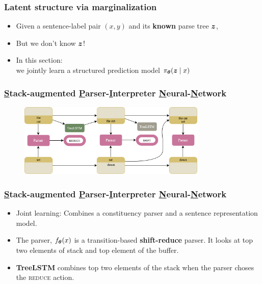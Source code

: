 
\begin{frame}
\frametitle{Latent structure via marginalization}
\begin{itemize}
    \item Given a sentence-label pair $(x, y)$ and its \textbf{known} parse
        tree $\boldsymbol{z}$,\\
    \item<5-> But we don't know $\boldsymbol{z}$!
    \item<6-> In this section: \\
        \quad we jointly learn a structured prediction model $\pi_{\boldsymbol{\theta}}(\boldsymbol{z} \mid x)$\\

\end{itemize}


\end{frame}



\begin{frame}
\frametitle{\underline{S}tack-augmented \underline{P}arser-\underline{I}nterpreter \underline{N}eural-\underline{N}etwork}%
{}
\begin{figure}
\includegraphics[width=0.8\textwidth]{img/spinnLatentTutorial.png}
\end{figure}
\end{frame}%


\begin{frame}%
\frametitle{\underline{S}tack-augmented \underline{P}arser-\underline{I}nterpreter \underline{N}eural-\underline{N}etwork}%
{}

\begin{itemize}%
\item Joint learning: Combines a constituency parser and a sentence representation model.
\item<2-> The parser, $f_{\boldsymbol{\theta}}(x)$ is a transition-based \textbf{shift-reduce} parser. It looks at top two elements of stack and top element of the buffer.
\item<3-> \textbf{TreeLSTM} combines top two elements of the stack when the parser choses the {\rmfamily\scshape{reduce}} action.
\end{itemize}%
\end{frame}

